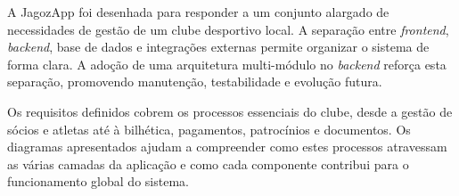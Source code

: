 A JagozApp foi desenhada para responder a um conjunto alargado de necessidades
de gestão de um clube desportivo local. A separação entre \textit{frontend},
\textit{backend}, base de dados e integrações externas permite organizar o
sistema de forma clara. A adoção de uma arquitetura multi-módulo no
\textit{backend} reforça esta separação, promovendo manutenção, testabilidade
e evolução futura.

Os requisitos definidos cobrem os processos essenciais do clube, desde a gestão
de sócios e atletas até à bilhética, pagamentos, patrocínios e documentos. Os
diagramas apresentados ajudam a compreender como estes processos atravessam as
várias camadas da aplicação e como cada componente contribui para o
funcionamento global do sistema.
